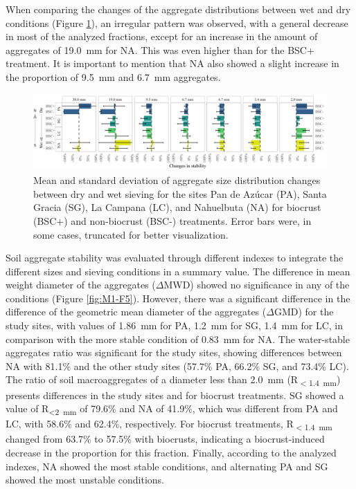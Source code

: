 When comparing the changes of the aggregate distributions between wet and dry conditions (Figure \ref{fig:M1-F4}), an irregular pattern was observed, with a general decrease in most of the analyzed fractions, except for an increase in the amount of aggregates of \SI{19.0}{\milli\meter} for NA. This was even higher than for the BSC+ treatment. It is important to mention that NA also showed a slight increase in the proportion of \SI{9.5}{\milli\meter} and \SI{6.7}{\milli\meter} aggregates.

\begin{figure}[H]
	\centering
	\includegraphics[width=1\textwidth]{img/M1-Figure_4.png}
	\caption{Mean and standard deviation of aggregate size distribution changes between dry and wet sieving for the sites Pan de Azúcar (PA), Santa Gracia (SG), La Campana (LC), and Nahuelbuta (NA) for biocrust (BSC+) and non-biocrust (BSC-) treatments. Error bars were, in some cases, truncated for better visualization.}
	\label{fig:M1-F4}
\end{figure}

Soil aggregate stability was evaluated through different indexes to integrate the different sizes and sieving conditions in a summary value. The difference in mean weight diameter of the aggregates ($\Delta$MWD) showed no significance in any of the conditions (Figure \ref{fig:M1-F5}). However, there was a significant difference in the difference of the geometric mean diameter of the aggregates ($\Delta$GMD) for the study sites, with values of \SI{1.86}{\milli\meter} for PA, \SI{1.2}{\milli\meter} for SG, \SI{1.4}{\milli\meter} for LC, in comparison with the more stable condition of \SI{0.83}{\milli\meter} for NA. The water-stable aggregates ratio was significant for the study sites, showing differences between NA with 81.1\% and the other study sites (57.7\% PA, 66.2\% SG, and 73.4\% LC). The ratio of soil macroaggregates of a diameter less than \SI{2.0}{\milli\meter} (R\textsubscript{$<$\SI{1.4}{\milli\meter}}) presents differences in the study sites and for biocrust treatments. SG showed a value of R\textsubscript{<\SI{2}{\milli\meter}} of 79.6\% and NA of 41.9\%, which was different from PA and LC, with 58.6\% and 62.4\%, respectively. For biocrust treatments, R\textsubscript{$<$\SI{1.4}{\milli\meter}} changed from 63.7\% to 57.5\% with biocrusts, indicating a biocrust-induced decrease in the proportion for this fraction. Finally, according to the analyzed indexes, NA showed the most stable conditions, and alternating PA and SG showed the most unstable conditions.

